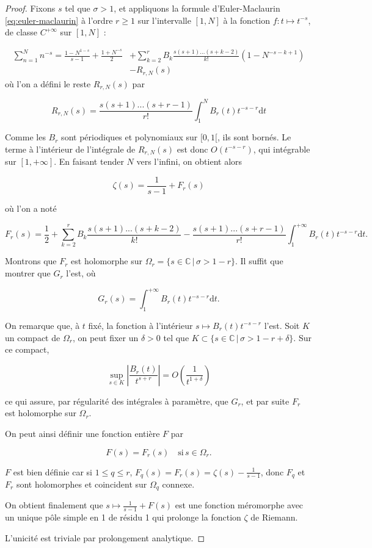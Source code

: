 \documentclass[french]{report}
\begin{document}
\begin{proof}
Fixons $s$ tel que $\sigma>1$, et appliquons la formule d'Euler-Maclaurin \ref{eq:euler-maclaurin} à l'ordre $r\geq1$ sur l'intervalle $[1,N]$ à la fonction $f:t\mapsto t^{-s}$, de classe $C^{+\infty}$ sur $[1,N]$ :

\begin{align*}
  \sum_{n=1}^N n^{-s} = \frac{1-N^{1-s}}{s-1} + \frac{1+N^{-s}}{2} &+ \sum_{k=2}^r B_k\frac{s(s+1)...(s+k-2)}{k!}(1-N^{-s-k+1}) \\
  &- R_{r,N}(s)
\end{align*}
où l'on a défini le reste $ R_{r,N}(s)$ par

\[  R_{r,N}(s) = \frac{s(s+1)...(s+r-1)}{r!}\int_1^N B_r(t)t^{-s-r}\mathrm{d}t \]

Comme les $B_r$ sont périodiques et polynomiaux sur $[0,1[$, ils sont bornés. Le terme à l'intérieur de l'intégrale de $R_{r,N}(s)$ est donc $O(t^{-s-r})$, qui intégrable sur $[1, +\infty]$. En faisant tender $N$ vers l'infini, on obtient alors

\[ \zeta(s) = \frac{1}{s-1} + F_r(s) \]

où l'on a noté

\[ F_r(s) = \frac{1}{2} + \sum_{k=2}^r B_k\frac{s(s+1)...(s+k-2)}{k!} - \frac{s(s+1)...(s+r-1)}{r!}\int_1^{+\infty} B_r(t)t^{-s-r}\mathrm{d}t. \]

Montrons que $F_r$ est holomorphe sur $\Omega_r=\{ s\in\mathbb{C}\,|\,\sigma > 1-r\}$. Il suffit que montrer que $G_r$ l'est, où

\[ G_r(s) = \int_1^{+\infty} B_r(t)t^{-s-r}\mathrm{d}t.\]

On remarque que, à $t$ fixé, la fonction à l'intérieur $s\mapsto B_r(t)t^{-s-r}$ l'est. Soit $K$ un compact de $\Omega_r$, on peut fixer un $\delta>0$ tel que $K\subset\{ s\in\mathbb{C}\,|\,\sigma > 1-r+\delta\}$. Sur ce compact,

\[ \sup_{s\in K}\left|\frac{B_r(t)}{t^{s+r}}\right| = O\left(\frac{1}{t^{1+\delta}}\right) \]

ce qui assure, par régularité des intégrales à paramètre, que $G_r$, et par suite $F_r$ est holomorphe sur $\Omega_r$.

On peut ainsi définir une fonction entière $F$ par

\[ F(s) = F_r(s) \quad\text{si}\,s\in\Omega_r. \]

$F$ est bien définie car si $1\leq q\leq r$, $F_q(s)=F_r(s)=\zeta(s)-\frac{1}{s-1}$, donc $F_q$ et $F_r$ sont holomorphes et coincident sur $\Omega_q$ connexe.

On obtient finalement que $s\mapsto\frac{1}{s-1}+F(s)$ est une fonction méromorphe avec un unique pôle simple en 1 de résidu 1 qui prolonge la fonction $\zeta$ de Riemann.

L'unicité est triviale par prolongement analytique.
\end{proof}
\end{document}
